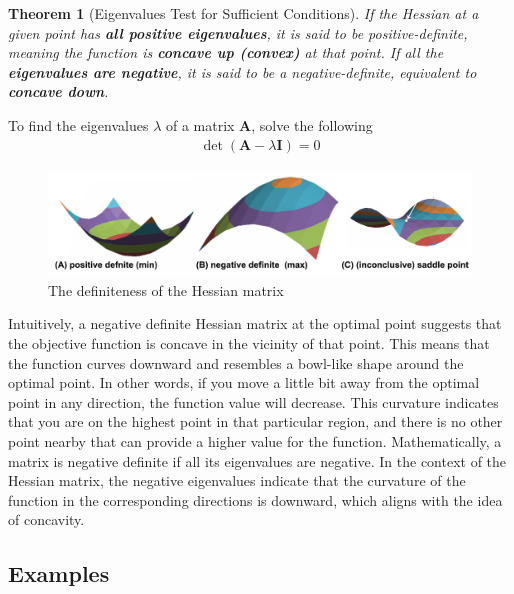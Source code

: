 \documentclass[11pt,a4paper]{book}
\newtheorem{theorem}{Theorem}[section]
\theoremstyle{definition}\newtheorem{definition}{Definition}
\theoremstyle{definition}\newtheorem{fact}{Fact}
\theoremstyle{definition}\newtheorem{remark}{Remark}
\theoremstyle{definition}\newtheorem{ex}{Ex.}
\theoremstyle{definition}\newtheorem{project}{Project}
\theoremstyle{definition}\newtheorem{problem}{Problem}
\theoremstyle{definition}\newtheorem{example}{Example}
\newenvironment{ftheorem}
{\begin{mdframed}\begin{theorem}}
		{\end{theorem}\end{mdframed}}
\numberwithin{theorem}{section}
\numberwithin{corollary}{chapter}
\numberwithin{assumption}{chapter}
\numberwithin{definition}{chapter}
\numberwithin{prop}{chapter}
\numberwithin{notation}{chapter}
\numberwithin{problem}{chapter}
\numberwithin{example}{chapter}
\numberwithin{fact}{chapter}
\numberwithin{ex}{chapter}
\def\A{\mathbf A}
\def\I{\mathbf I}
\begin{document}
	\begin{ftheorem}[Eigenvalues Test for Sufficient Conditions]
		If the Hessian at a given point has \textbf{all positive eigenvalues}, it is said to be positive-definite, meaning the function is \textbf{concave up (convex)} at that point. If all the \textbf{eigenvalues are negative}, it is said to be a negative-definite, equivalent to \textbf{concave down}.
	\end{ftheorem}
	
	To find the eigenvalues $\lambda$ of a matrix $\A$, solve the following
	\begin{align*}
		 \det (\A - \lambda \I) = 0      
	\end{align*}
	
	\begin{figure}[ht]
		\centering
		\includegraphics{figs/hessian.png}
		\caption{The definiteness of the Hessian matrix}
	\end{figure}
	
	Intuitively, a negative definite Hessian matrix at the optimal point suggests that the objective function is concave in the vicinity of that point. This means that the function curves downward and resembles a bowl-like shape around the optimal point. In other words, if you move a little bit away from the optimal point in any direction, the function value will decrease. This curvature indicates that you are on the highest point in that particular region, and there is no other point nearby that can provide a higher value for the function. Mathematically, a matrix is negative definite if all its eigenvalues are negative. In the context of the Hessian matrix, the negative eigenvalues indicate that the curvature of the function in the corresponding directions is downward, which aligns with the idea of concavity.
	
	\subsection{Examples}
	
\end{document}
